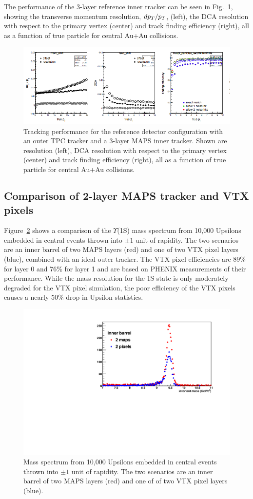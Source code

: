 The performance of the 3-layer reference inner tracker can be seen in
Fig.~\ref{fig:tracking_reference}, showing the transverse momentum
resolution, $d\mbox{${p_T}$}/\mbox{${p_T}$}$, (left), the DCA resolution with respect to the
primary vertex (center) and track finding efficiency (right), all as a
function of true particle \pt for central \hijing Au+Au collisions.
\begin{figure}[hbt]
  \centering
  \includegraphics[width=0.9\linewidth]{figs/tracking_performance_reference}
  \caption{Tracking performance for the reference detector
    configuration with an outer TPC tracker and a 3-layer MAPS inner
    tracker. Shown are \pt resolution (left), DCA resolution with
    respect to the primary vertex (center) and track finding
    efficiency (right), all as a function of true particle \pt for
    central \hijing Au+Au collisions.}
  \label{fig:tracking_reference}
\end{figure}

\subsection{Comparison of 2-layer MAPS tracker and VTX pixels} 

Figure~\ref{fig:ups1s_recomass_comparison} shows a comparison of the
$\Upsilon$(1S) mass spectrum from 10,000 Upsilons embedded in central
\hijing events thrown into $\pm1$ unit of rapidity. The two scenarios
are an inner barrel of two MAPS layers (red) and one of two VTX
pixel layers (blue), combined with an ideal outer tracker.  
The VTX pixel efficiencies are 89\% for layer 0 and 76\% for layer 1 and are based
on PHENIX measurements of their performance. While the mass resolution for the 1S state is
only moderately degraded for the VTX pixel simulation, 
the poor efficiency of the VTX pixels causes a nearly 50\% 
drop in Upsilon statistics.
\begin{figure}[hbt]
  \centering
  \includegraphics[width=0.5\linewidth]{figs/ups1s_recomass_comparison}
  \caption{Mass spectrum from 10,000 Upsilons embedded in central
\hijing events thrown into $\pm1$ unit of rapidity. The two scenarios
are an inner barrel of two MAPS layers (red) and one of of two VTX
pixel layers (blue).}
\label{fig:ups1s_recomass_comparison}
\end{figure}

